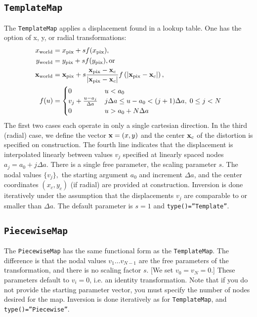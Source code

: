 \documentclass[11pt,preprint,flushrt]{aastex}
\newcommand{\vx}{\mbox{\bf x}}
\begin{document}
\subsection{\tt TemplateMap}
The {\tt TemplateMap} applies a displacement found in a lookup table.
One has the option of x, y, or radial transformations:
\begin{align}
  x_{\rm world} & = x_{\rm pix} + s f(x_{\rm pix}), \\
  y_{\rm world} & = y_{\rm pix} + s f(y_{\rm pix}), \text{or} \\
  \vx_{\rm world} & = \vx_{\rm pix} + s \frac{\vx_{\rm pix}-\vx_c}{|\vx_{\rm pix}-\vx_c|} f\left(
          |\vx_{\rm pix}-\vx_c| \right), \\
  f(u) & = \begin{cases}
0 & u < a_0 \\
v_j + \frac{u-a_j}{\Delta a} & j\Delta a \le u-a_0 < (j+1)\Delta a, \; 0\le j < N \\
0 & u > a_0 + N\Delta a
\end{cases}
\end{align}
The first two cases each operate in only a single cartesian
  direction.  In the third (radial)
case, we define the vector $\vx=(x,y)$ and
the center $\vx_c$ of the distortion is specified on construction.
The fourth line indicates that the displacement is interpolated linearly between values $v_j$ specified at linearly spaced nodes $a_j = a_0+ j \Delta a$.  
There is a single free parameter, the scaling parameter
$s$.  The nodal values $\{v_j\},$ the starting argument $a_0$ and increment $\Delta a$, and the center coordinates $(x_c,y_c)$ (if radial) are provided at construction.
Inversion is done iteratively under the assumption that the displacements $v_j$ are comparable to or smaller than $\Delta a$.  The default parameter is $s=1$ and \texttt{type()=''Template''}.

\subsection{\tt PiecewiseMap}
The {\tt PiecewiseMap} has the same functional form as the \texttt{TemplateMap}.  The difference is that the nodal values $v_1\ldots v_{N-1}$ are the free parameters of the transformation, and there is no scaling factor $s$. [We set $v_0=v_N=0.$] These parameters default to $v_i=0$, i.e. an identity transformation.  Note that if you do not provide the starting parameter vector, you must specify the number of nodes desired for the map.  Inversion is done iteratively as for \texttt{TemplateMap}, and \texttt{type()=''Piecewise''}.
\end{document}
